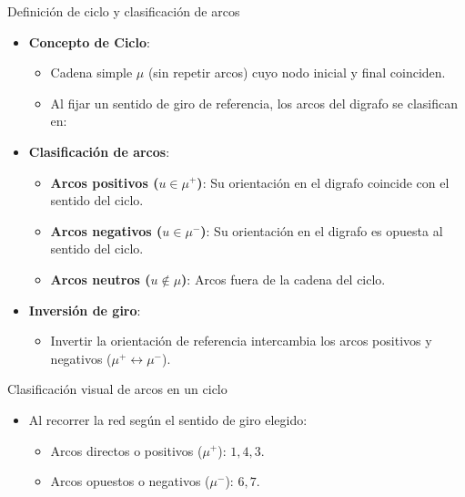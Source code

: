 \documentclass[
  ignorenonframetext,
]{beamer}
\providecommand{\tightlist}{%
  \setlength{\itemsep}{0pt}\setlength{\parskip}{0pt}}
\begin{document}
\begin{frame}{Definición de ciclo y clasificación de arcos}
\label{definiciuxf3n-de-ciclo-y-clasificaciuxf3n-de-arcos}
\begin{itemize}
\tightlist
\item
  \textbf{Concepto de Ciclo}:

  \begin{itemize}
  \tightlist
  \item
    Cadena simple \(\mu\) (sin repetir arcos) cuyo nodo inicial y final
    coinciden.
  \item
    Al fijar un sentido de giro de referencia, los arcos del digrafo se
    clasifican en:
  \end{itemize}
\item
  \textbf{Clasificación de arcos}:

  \begin{itemize}
  \tightlist
  \item
    \textbf{Arcos positivos (\(u \in \mu^+\))}: Su orientación en el
    digrafo coincide con el sentido del ciclo.
  \item
    \textbf{Arcos negativos (\(u \in \mu^-\))}: Su orientación en el
    digrafo es opuesta al sentido del ciclo.
  \item
    \textbf{Arcos neutros (\(u \notin \mu\))}: Arcos fuera de la cadena
    del ciclo.
  \end{itemize}
\item
  \textbf{Inversión de giro}:

  \begin{itemize}
  \tightlist
  \item
    Invertir la orientación de referencia intercambia los arcos
    positivos y negativos (\(\mu^+ \leftrightarrow \mu^-\)).
  \end{itemize}
\end{itemize}
\end{frame}

\begin{frame}{Clasificación visual de arcos en un ciclo}
\label{clasificaciuxf3n-visual-de-arcos-en-un-ciclo}
\begin{itemize}
\tightlist
\item
  Al recorrer la red según el sentido de giro elegido:

  \begin{itemize}
  \tightlist
  \item
    Arcos directos o positivos (\(\mu^+\)): \(1, 4, 3\).
  \item
    Arcos opuestos o negativos (\(\mu^-\)): \(6, 7\).
  \end{itemize}
\end{itemize}
\end{frame}
\end{document}
